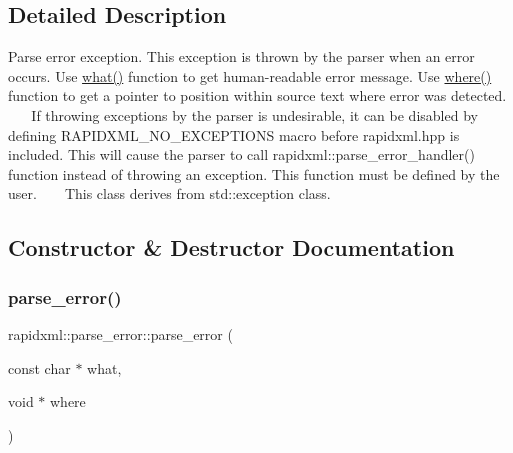 \subsection{Detailed Description}
Parse error exception. This exception is thrown by the parser when an error occurs. Use \mbox{\hyperlink{classrapidxml_1_1parse__error_a986003116ebcb49a69a20228da306232}{what()}} function to get human-\/readable error message. Use \mbox{\hyperlink{classrapidxml_1_1parse__error_ab139528f4d9e960f0ee807d22d6c032d}{where()}} function to get a pointer to position within source text where error was detected. ~\newline
~\newline
 If throwing exceptions by the parser is undesirable, it can be disabled by defining R\+A\+P\+I\+D\+X\+M\+L\+\_\+\+N\+O\+\_\+\+E\+X\+C\+E\+P\+T\+I\+O\+NS macro before rapidxml.\+hpp is included. This will cause the parser to call rapidxml\+::parse\+\_\+error\+\_\+handler() function instead of throwing an exception. This function must be defined by the user. ~\newline
~\newline
 This class derives from {\ttfamily std\+::exception} class. 

\subsection{Constructor \& Destructor Documentation}
\mbox{\label{classrapidxml_1_1parse__error_aea12a301271c393fb627b368fb9f35c1}} 
\subsubsection{\texorpdfstring{parse\+\_\+error()}{parse\_error()}\hspace{0.1cm}{\footnotesize\ttfamily [1/2]}}
{\footnotesize\ttfamily rapidxml\+::parse\+\_\+error\+::parse\+\_\+error (\begin{DoxyParamCaption}\item[{const char $\ast$}]{what,  }\item[{void $\ast$}]{where }\end{DoxyParamCaption})\hspace{0.3cm}{\ttfamily [inline]}}



